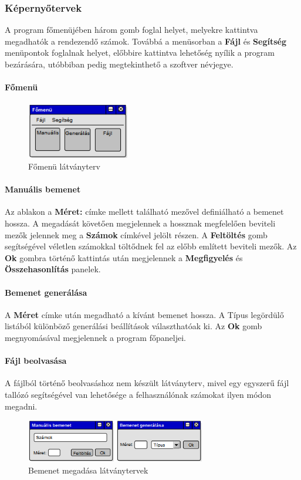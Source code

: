 \documentclass{elteikthesis}
\begin{document}
\subsubsection{Képernyőtervek}
A program főmenüjében három gomb foglal helyet, melyekre kattintva megadhatók a rendezendő számok. Továbbá a menüsorban a \textbf{Fájl} és \textbf{Segítség} menüpontok foglalnak helyet, előbbire kattintva lehetőség nyílik a program bezárására, utóbbiban pedig megtekinthető a szoftver névjegye.
\paragraph{Főmenü}
\begin{figure}[H]
	\centering
	\includegraphics[width=0.4\textwidth]{pics/plan_mainmenu.png}
	\caption{Főmenü látványterv}
\end{figure}
\paragraph{Manuális bemenet}
Az ablakon a \textbf{Méret:} címke mellett található mezővel definiálható a bemenet hossza. A megadását követően megjelennek a hossznak megfelelően beviteli mezők jelennek meg a \textbf{Számok} címkével jelölt részen. A \textbf{Feltöltés} gomb segítségével véletlen számokkal töltődnek fel az előbb említett beviteli mezők. Az \textbf{Ok} gombra történő kattintás után megjelennek a \textbf{Megfigyelés} és \textbf{Összehasonlítás} panelek.
\paragraph{Bemenet generálása}
A \textbf{Méret} címke után megadható a kívánt bemenet hossza. A Típus legördülő listából különböző generálási beállítások választhatóak ki. Az \textbf{Ok} gomb megnyomásával megjelennek a program főpaneljei.
\paragraph{Fájl beolvasása}
A fájlból történő beolvasáshoz nem készült látványterv, mivel egy egyszerű fájl tallózó segítségével van lehetősége a felhasználónak számokat ilyen módon megadni.
\begin{figure}[H]
	\centering
	\includegraphics[width=0.7\textwidth]{pics/plan_input.png}
	\caption{Bemenet megadása látványtervek}
\end{figure}
\end{document}
